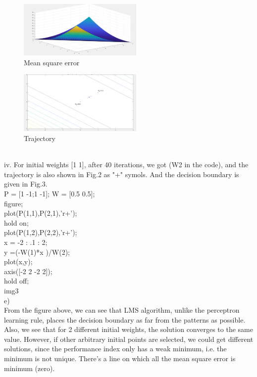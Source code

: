 \documentclass{article}
\begin{document}
\begin{figure}[htp]
    \centering
    \includegraphics[width=6cm]{photos/mean_error.png}
    \caption{Mean square error}
    \label{}
\end{figure}
\begin{figure}[htp]
    \centering
    \includegraphics[width=6cm]{photos/pic2.png}
    \caption{Trajectory}
    \label{}
\end{figure}
\\
iv. For initial weights [1 1], after 40 iterations, we got   (W2 in the code), and the trajectory is also shown in Fig.2 as "+" symols. And the decision boundary is given in Fig.3.
\\
P = [1 -1;1 -1];
W = [0.5 0.5];\\
figure;\\
plot(P(1,1),P(2,1),'r+');\\
hold on;\\
plot(P(1,2),P(2,2),'r+');\\

x = -2 : .1 : 2;\\
y =(-W(1)*x )/W(2);\\
plot(x,y);\\
axis([-2 2 -2 2]);\\

hold off;  \\
img3\\
e)\\
	From the figure above, we can see that LMS algorithm, unlike the perceptron learning rule, places the decision boundary as far from the patterns as possible.\\

Also, we see that for 2 different initial weights, the solution converges to the same value. However, if other arbitrary initial points are selected, we could get different solutions, since the performance index only has a weak minimum, i.e. the minimum is not unique. There's a line on which all the mean square error is minimum (zero). \\
\end{document}
